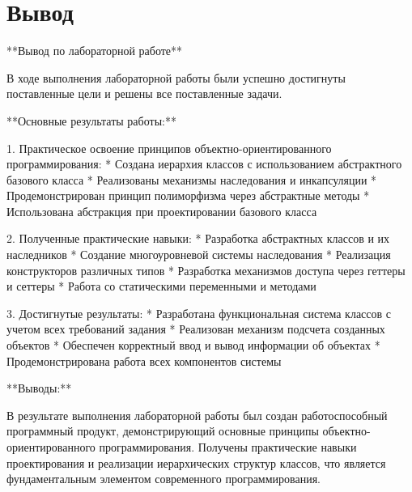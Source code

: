 \chapter*{Вывод}
\label{ch:Conclusion}

\begin{markdown}

**Вывод по лабораторной работе**

В ходе выполнения лабораторной работы были успешно достигнуты поставленные цели и решены все поставленные задачи. 

**Основные результаты работы:**

1. Практическое освоение принципов объектно-ориентированного программирования:
* Создана иерархия классов с использованием абстрактного базового класса
* Реализованы механизмы наследования и инкапсуляции
* Продемонстрирован принцип полиморфизма через абстрактные методы
* Использована абстракция при проектировании базового класса

2. Полученные практические навыки:
* Разработка абстрактных классов и их наследников
* Создание многоуровневой системы наследования
* Реализация конструкторов различных типов
* Разработка механизмов доступа через геттеры и сеттеры
* Работа со статическими переменными и методами

3. Достигнутые результаты:
* Разработана функциональная система классов с учетом всех требований задания
* Реализован механизм подсчета созданных объектов
* Обеспечен корректный ввод и вывод информации об объектах
* Продемонстрирована работа всех компонентов системы

**Выводы:**

В результате выполнения лабораторной работы был создан работоспособный программный продукт, демонстрирующий основные принципы объектно-ориентированного программирования. Получены практические навыки проектирования и реализации иерархических структур классов, что является фундаментальным элементом современного программирования.

\end{markdown}

\endinput



